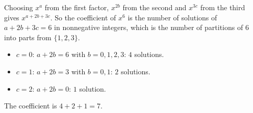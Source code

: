 Choosing $x^{a}$ from the first factor, $x^{2b}$ from the second and $x^{3c}$ from the third gives $x^{a+2b+3c}$. So the coefficient of $x^6$ is the number of solutions of $a+2b+3c=6$ in nonnegative integers, which is the number of partitions of $6$ into parts from $\{1,2,3\}$.
\begin{itemize}
\item $c=0$: $a+2b=6$ with $b=0,1,2,3$: $4$ solutions.
\item $c=1$: $a+2b=3$ with $b=0,1$: $2$ solutions.
\item $c=2$: $a+2b=0$: $1$ solution.
\end{itemize}
The coefficient is $4+2+1=\boxed{7}$.
